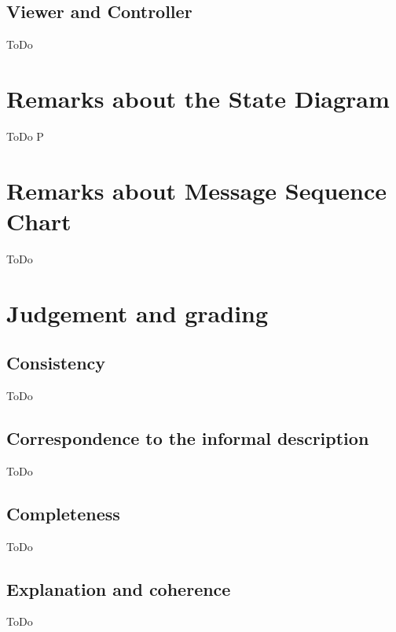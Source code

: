 \documentclass[a4paper,11pt]{article}
\begin{document}
    \subsection{Viewer and Controller}
    ToDo

	\section{Remarks about the State Diagram}
    ToDo
P
    \section{Remarks about Message Sequence Chart}
    ToDo

    \section{Judgement and grading}
    \subsection{Consistency}
    ToDo

    \subsection{Correspondence to the informal description}
    ToDo

    \subsection{Completeness}
    ToDo

    \subsection{Explanation and coherence}
    ToDo
\end{document}
